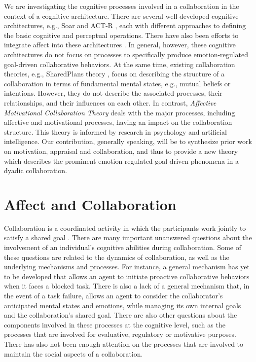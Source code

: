 \documentclass[letterpaper]{article}
\begin{document}
We are investigating the cognitive processes involved in a collaboration in the
context of a cognitive architecture. There are several well-developed cognitive
architectures, e.g., Soar \cite{laird:soar} and ACT-R \cite{anderson:act-r},
each with different approaches to defining the basic cognitive and perceptual
operations. There have also been efforts to integrate affect into these
architectures \cite{dancy:actR-physiology-affect,marinier:behavior-emotion}. In
general, however, these cognitive architectures do not focus on processes to
specifically produce emotion-regulated goal-driven collaborative behaviors. At
the same time, existing collaboration theories, e.g., SharedPlans theory
\cite{grosz:shared-plans}, focus on describing the structure of a
collaboration in terms of fundamental mental states, e.g., mutual beliefs or
intentions. However, they do not describe the associated processes, their
relationships, and their influences on each other. In contrast,
\textit{Affective Motivational Collaboration Theory} deals with the major
processes, including affective and motivational processes, having an impact on
the collaboration structure. This theory is informed by research in psychology
and artificial intelligence. Our contribution, generally speaking, will be to
synthesize prior work on motivation, appraisal and collaboration, and thus to
provide a new theory which describes the prominent emotion-regulated goal-driven
phenomena in a dyadic collaboration.

\section{Affect and Collaboration}

Collaboration is a coordinated activity in which the participants work jointly
to satisfy a shared goal \cite{grosz:shared-plans}. There are many important
unanswered questions about the involvement of an individual's cognitive
abilities during collaboration. Some of these questions are related to the
dynamics of collaboration, as well as the underlying mechanisms and processes.
For instance, a general mechanism has yet to be developed that allows an agent
to initiate proactive collaborative behaviors when it faces a blocked task.
There is also a lack of a general mechanism that, in the event of a task
failure, allows an agent to consider the collaborator's anticipated mental
states and emotions, while managing its own internal goals and the
collaboration's shared goal. There are also other questions about the components
involved in these processes at the cognitive level, such as the processes that
are involved for evaluative, regulatory or motivative purposes. There has also
not been enough attention on the processes that are involved to maintain the
social aspects of a collaboration.
\end{document}
